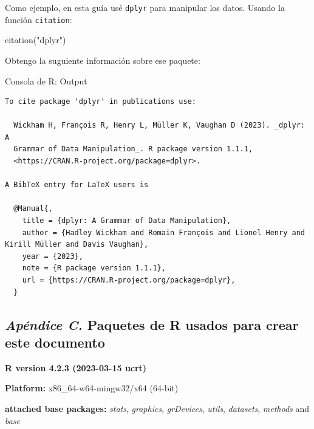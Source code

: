 \documentclass[
  bookmarksnumbered]{article}
\newenvironment{Shaded}{\begin{snugshade}}{\end{snugshade}}
\newcommand{\FunctionTok}[1]{\textcolor[rgb]{0.39,0.29,0.61}{#1}}
\newcommand{\NormalTok}[1]{\textcolor[rgb]{0.12,0.11,0.11}{#1}}
\newcommand{\StringTok}[1]{\textcolor[rgb]{0.75,0.01,0.01}{#1}}
\begin{document}
Como ejemplo, en esta guía usé \texttt{dplyr} \autocite{WickhamDplyr2021} para manipular los datos. Usando la función \texttt{citation}:

\begin{Shaded}
\begin{Highlighting}[]
\FunctionTok{citation}\NormalTok{(}\StringTok{"dplyr"}\NormalTok{)}
\end{Highlighting}
\end{Shaded}

Obtengo la suguiente información sobre ese paquete:

\begin{ROut}{Consola de R: Output~\thetcbcounter}
                \begin{footnotesize}
                \begin{verbatim} 
To cite package 'dplyr' in publications use:

  Wickham H, François R, Henry L, Müller K, Vaughan D (2023). _dplyr: A
  Grammar of Data Manipulation_. R package version 1.1.1,
  <https://CRAN.R-project.org/package=dplyr>.

A BibTeX entry for LaTeX users is

  @Manual{,
    title = {dplyr: A Grammar of Data Manipulation},
    author = {Hadley Wickham and Romain François and Lionel Henry and Kirill Müller and Davis Vaughan},
    year = {2023},
    note = {R package version 1.1.1},
    url = {https://CRAN.R-project.org/package=dplyr},
  }
 \end{verbatim}
                \end{footnotesize}
                \end{ROut}

\hypertarget{paquetes-list}{%
\subsection*{\texorpdfstring{\emph{Apéndice C.} Paquetes de R usados para crear este documento}{Apéndice C. Paquetes de R usados para crear este documento}}\label{paquetes-list}}

\textbf{R version 4.2.3 (2023-03-15 ucrt)}

\textbf{Platform:} x86\_64-w64-mingw32/x64 (64-bit)

\textbf{attached base packages:}
\emph{stats}, \emph{graphics}, \emph{grDevices}, \emph{utils}, \emph{datasets}, \emph{methods} and \emph{base}
\end{document}
